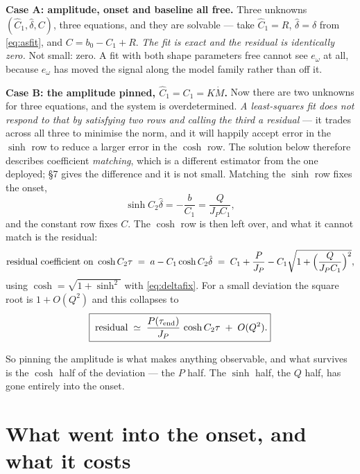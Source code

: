 \documentclass[11pt]{article}
\newcommand{\te}{\tau_{\rm end}}
\begin{document}
\textbf{Case A: amplitude, onset and baseline all free.} Three unknowns
$(\hat C_1,\hat\delta,C)$, three equations, and they are solvable ---
take $\hat C_1 = R$, $\hat\delta = \delta$ from \eqref{eq:asfit}, and
$C = b_0 - C_1 + R$. \emph{The fit is exact and the residual is
identically zero.} Not small: zero. A fit with both shape parameters
free cannot see $e_\omega$ at all, because $e_\omega$ has moved the
signal along the model family rather than off it.

\textbf{Case B: the amplitude pinned, $\hat C_1 = C_1 = K\dot M$.} Now
there are two unknowns for three equations, and the system is
overdetermined. \emph{A least-squares fit does not respond to that by
satisfying two rows and calling the third a residual} --- it trades
across all three to minimise the norm, and it will happily accept error
in the $\sinh$ row to reduce a larger error in the $\cosh$ row. The
solution below therefore describes coefficient \emph{matching}, which is
a different estimator from the one deployed; \S7 gives the difference
and it is not small. Matching the $\sinh$ row fixes the onset,
\begin{equation}
  \sinh C_2\hat\delta = -\frac{b}{C_1} = \frac{Q}{J_PC_1},
  \label{eq:deltafix}
\end{equation}
and the constant row fixes $C$. The $\cosh$ row is then left over, and
what it cannot match is the residual:
\begin{equation}
  \text{residual coefficient on }\cosh C_2\tau
   \;=\; a - C_1\cosh C_2\hat\delta
   \;=\; C_1 + \frac{P}{J_P}
        - C_1\sqrt{1 + \Bigl(\frac{Q}{J_PC_1}\Bigr)^{2}} ,
\end{equation}
using $\cosh = \sqrt{1+\sinh^2}$ with \eqref{eq:deltafix}. For a small
deviation the square root is $1 + O(Q^2)$ and this collapses to
\begin{equation}
  \boxed{\;\text{residual} \;\simeq\;
  \frac{P(\te)}{J_P}\,\cosh C_2\tau \;+\; O(Q^2) . }
  \label{eq:resid}
\end{equation}

So pinning the amplitude is what makes anything observable, and what
survives is the $\cosh$ half of the deviation --- the $P$ half. The
$\sinh$ half, the $Q$ half, has gone entirely into the onset.

\section{What went into the onset, and what it costs}
\end{document}
